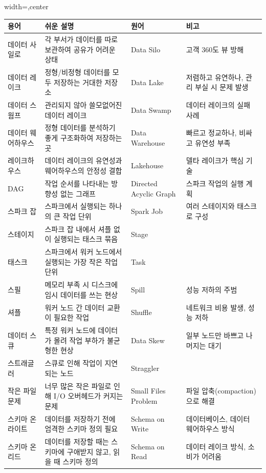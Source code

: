 \documentclass[11pt,a4paper]{article}
\theoremstyle{definition}
\begin{document}
\begin{tcolorbox}[title=\textbf{핵심 용어집}, colback=blue!5!white, colframe=blue!75!black, sharp corners, boxrule=0.8pt]
\begin{adjustbox}{width=\textwidth,center}
\begin{tabular}{llll}
\toprule
\textbf{용어} & \textbf{쉬운 설명} & \textbf{원어} & \textbf{비고} \\
\midrule
데이터 사일로 & 각 부서가 데이터를 따로 보관하여 공유가 어려운 상태 & Data Silo & 고객 360도 뷰 방해 \\
데이터 레이크 & 정형/비정형 데이터를 모두 저장하는 거대한 저장소 & Data Lake & 저렴하고 유연하나, 관리 부실 시 문제 발생 \\
데이터 스웜프 & 관리되지 않아 쓸모없어진 데이터 레이크 & Data Swamp & 데이터 레이크의 실패 사례 \\
데이터 웨어하우스 & 정형 데이터를 분석하기 좋게 구조화하여 저장하는 곳 & Data Warehouse & 빠르고 정교하나, 비싸고 유연성 부족 \\
레이크하우스 & 데이터 레이크의 유연성과 웨어하우스의 안정성 결합 & Lakehouse & 델타 레이크가 핵심 기술 \\
\midrule
DAG & 작업 순서를 나타내는 방향성 없는 그래프 & Directed Acyclic Graph & 스파크 작업의 실행 계획 \\
스파크 잡 & 스파크에서 실행되는 하나의 큰 작업 단위 & Spark Job & 여러 스테이지와 태스크로 구성 \\
스테이지 & 스파크 잡 내에서 셔플 없이 실행되는 태스크 묶음 & Stage & \\
태스크 & 스파크에서 워커 노드에서 실행되는 가장 작은 작업 단위 & Task & \\
스필 & 메모리 부족 시 디스크에 임시 데이터를 쓰는 현상 & Spill & 성능 저하의 주범 \\
셔플 & 워커 노드 간 데이터 교환이 필요한 작업 & Shuffle & 네트워크 비용 발생, 성능 저하 \\
데이터 스큐 & 특정 워커 노드에 데이터가 몰려 작업 부하가 불균형한 현상 & Data Skew & 일부 노드만 바쁘고 나머지는 대기 \\
스트래글러 & 스큐로 인해 작업이 지연되는 노드 & Straggler & \\
작은 파일 문제 & 너무 많은 작은 파일로 인해 I/O 오버헤드가 커지는 문제 & Small Files Problem & 파일 압축(compaction)으로 해결 \\
\midrule
스키마 온 라이트 & 데이터를 저장하기 전에 엄격한 스키마 정의 필요 & Schema on Write & 데이터베이스, 데이터 웨어하우스 방식 \\
스키마 온 리드 & 데이터를 저장할 때는 스키마에 구애받지 않고, 읽을 때 스키마 정의 & Schema on Read & 데이터 레이크 방식, 소비가 어려움 \\

\end{tabular}
\end{adjustbox}
\end{tcolorbox}
\end{document}
